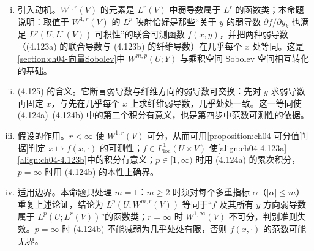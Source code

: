 \documentclass[../../main.tex]{subfiles}%
\begin{document}
\begin{remark}
\begin{enumerate}[(i)]
\item 引入动机。$W^{1,r}(V)$ 的元素是 $L^r(V)$ 中弱导数属于 $L^r$ 的函数类；本命题说明：取值于 $W^{1,r}(V)$ 的 $L^p$ 映射恰好是那些“关于 $y$ 的弱导数 $\partial f/\partial y_k$ 也满足 $L^p(U;L^r(V))$ 可积性”的联合可测函数 $f(x,y)$，并把两种弱导数（(4.123a) 的联合导数与 (4.123b) 的纤维导数）在几乎每个 $x$ 处等同。这是\cref{section:ch04-向量Sobolev}中 $W^{m,p}(U;Y)$ 与乘积空间 Sobolev 空间相互转化的基础。

\item (4.125) 的含义。它断言弱导数与纤维方向的弱导数可交换：先对 $y$ 求弱导数再固定 $x$，与先在几乎每个 $x$ 上求纤维弱导数，几乎处处一致。这一等同使 (4.124a)--(4.124b) 中的第二个积分有意义，也是第四步中范数可测性的依据。

\item 假设的作用。$r<\infty$ 使 $W^{1,r}(V)$ 可分，从而可用\cref{proposition:ch04-可分值判据}判定 $x\mapsto f(x,\cdot)$ 的可测性；$f\in L^1_{\mathrm{loc}}(U\times V)$ 使\eqref{align:ch04-4.123a}--\eqref{align:ch04-4.123b}中的积分有意义；$p\in[1,\infty)$ 时用 (4.124a) 的累次积分，$p=\infty$ 时用 (4.124b) 的本性上确界。

\item 适用边界。本命题只处理 $m=1$：$m\geqslant2$ 时须对每个多重指标 $\alpha$（$|\alpha|\leqslant m$）重复上述论证，结论为 $L^p(U;W^{m,r}(V))$ 等同于“$f$ 及其所有 $y$ 方向弱导数属于 $L^p(U;L^r(V))$”的函数类；$r=\infty$ 时 $W^{1,\infty}(V)$ 不可分，判别准则失效。$p=\infty$ 时 (4.124b) 不能减弱为几乎处处有限，否则 $f(x,\cdot)$ 的范数可能无界。
\end{enumerate}
\end{remark}
\end{document}
